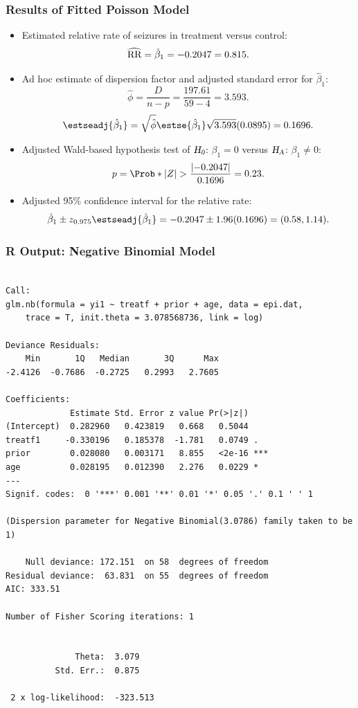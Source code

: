 \documentclass[oneside]{book}\usepackage[]{graphicx}\usepackage[svgnames]{xcolor}
\makeatletter
\newenvironment{kframe}{%
 \def\at@end@of@kframe{}%
 \ifinner\ifhmode%
  \def\at@end@of@kframe{\end{minipage}}%
  \begin{minipage}{\columnwidth}%
 \fi\fi%
 \def\FrameCommand##1{\hskip\@totalleftmargin \hskip-\fboxsep
 \colorbox{shadecolor}{##1}\hskip-\fboxsep
     \hskip-\linewidth \hskip-\@totalleftmargin \hskip\columnwidth}%
 \MakeFramed {\advance\hsize-\width
   \@totalleftmargin\z@ \linewidth\hsize
   \@setminipage}}%
 {\par\unskip\endMakeFramed%
 \at@end@of@kframe}
\newenvironment{knitrout}{}{} %
\let\exp\relax%
\newcommand{\HN}{\textsl{H}_{\textsl{0}}}%
\newcommand{\HA}{\textsl{H}_{\textsl{A}}}%
\newcommand{\RR}{\text{RR}}%
\DeclarePairedDelimiter\abs{\lvert}{\rvert}
\makeatother
\begin{document}
\subsubsection*{Results of Fitted Poisson Model}
\begin{itemize}
      \item Estimated relative rate of seizures in treatment versus control:
            \[ \widehat{\RR}=\exp{\hat{\beta}_1}=\exp{-0.2047}=0.815. \]
      \item Ad hoc estimate of dispersion factor and adjusted standard error for $ \hat{\beta}_1 $:
            \[ \hat{\phi}=\frac{D}{n-p}=\frac{197.61}{59-4}=3.593. \]
            \[ \estseadj{\hat{\beta}_1}=\sqrt{\hat{\phi}}\estse{\hat{\beta}_1}\sqrt{3.593}(0.0895)=0.1696. \]
      \item Adjusted Wald-based hypothesis test of $ \HN $: $ \beta_1=0 $ versus $ \HA $: $ \beta_1\ne 0 $:
            \[ p=\Prob*{\abs{Z}>\frac{\abs{-0.2047}}{0.1696}}=0.23. \]
      \item Adjusted 95\% confidence interval for the relative rate:
            \[ \exp{\hat{\beta}_1\pm z_{0.975}\estseadj{\hat{\beta}_1}}=\exp{-0.2047\pm 1.96(0.1696)}=(0.58,1.14). \]
\end{itemize}
\subsubsection*{R Output: Negative Binomial Model}
\begin{knitrout}
\color{fgcolor}\begin{kframe}
\begin{verbatim}

Call:
glm.nb(formula = yi1 ~ treatf + prior + age, data = epi.dat, 
    trace = T, init.theta = 3.078568736, link = log)

Deviance Residuals: 
    Min       1Q   Median       3Q      Max  
-2.4126  -0.7686  -0.2725   0.2993   2.7605  

Coefficients:
             Estimate Std. Error z value Pr(>|z|)    
(Intercept)  0.282960   0.423819   0.668   0.5044    
treatf1     -0.330196   0.185378  -1.781   0.0749 .  
prior        0.028080   0.003171   8.855   <2e-16 ***
age          0.028195   0.012390   2.276   0.0229 *  
---
Signif. codes:  0 '***' 0.001 '**' 0.01 '*' 0.05 '.' 0.1 ' ' 1

(Dispersion parameter for Negative Binomial(3.0786) family taken to be 1)

    Null deviance: 172.151  on 58  degrees of freedom
Residual deviance:  63.831  on 55  degrees of freedom
AIC: 333.51

Number of Fisher Scoring iterations: 1


              Theta:  3.079 
          Std. Err.:  0.875 

 2 x log-likelihood:  -323.513 
\end{verbatim}
\end{kframe}
\end{knitrout}
\end{document}
